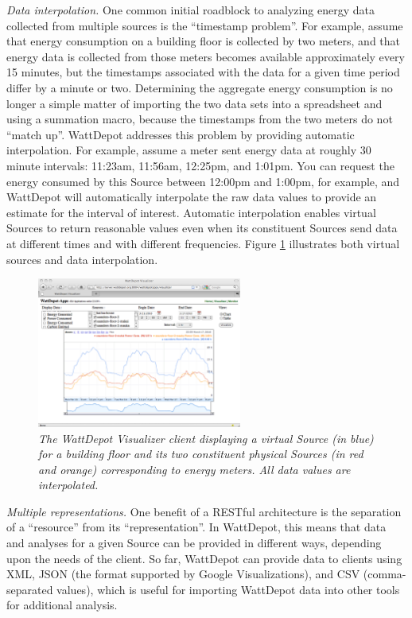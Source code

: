 \documentclass[conference,compsoc]{IEEEtran}
\begin{document}
{\em Data interpolation.} One common initial roadblock to analyzing energy
data collected from multiple sources is the ``timestamp problem''. For
example, assume that energy consumption on a building floor is collected by
two meters, and that energy data is collected from those meters becomes
available approximately every 15 minutes, but the timestamps associated
with the data for a given time period differ by a minute or two.
Determining the aggregate energy consumption is no longer a simple matter
of importing the two data sets into a spreadsheet and using a summation
macro, because the timestamps from the two meters do not ``match up''.
WattDepot addresses this problem by providing automatic interpolation. For
example, assume a meter sent energy data at roughly 30 minute intervals:
11:23am, 11:56am, 12:25pm, and 1:01pm.  You can request the energy consumed
by this Source between 12:00pm and 1:00pm, for example, and WattDepot will
automatically interpolate the raw data values to provide an estimate for
the interval of interest.  Automatic interpolation enables virtual Sources
to return reasonable values even when its constituent Sources send data at
different times and with different frequencies.  Figure \ref{fig:visualizer}
illustrates both virtual sources and data interpolation. 

\begin{figure}[!th]
  \center
  \includegraphics[width=0.6\textwidth]{visualizer.eps}
  \caption{\em \small The WattDepot Visualizer client displaying a virtual Source
    (in blue) for a building floor and its two constituent physical Sources (in red and orange) corresponding to energy meters. All data values are interpolated.}
  \label{fig:visualizer}
\end{figure} 

{\em Multiple representations.} One benefit of a RESTful architecture is
the separation of a ``resource'' from its ``representation''.  In
WattDepot, this means that data and analyses for a given Source can be
provided in different ways, depending upon the needs of the client.  So
far, WattDepot can provide data to clients using XML, JSON (the format
supported by Google Visualizations), and CSV (comma-separated values),
which is useful for importing WattDepot data into other tools for
additional analysis.
\end{document}
